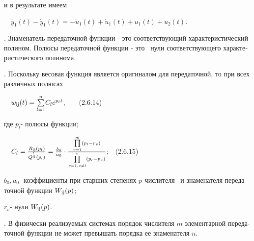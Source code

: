 \documentclass[a4paper]{article}
\newcommand\normalsubformula[1]{\text{\mathversion{normal}$#1$}}
\begin{document}
{\begin{russian}\sffamily
и в результате имеем
\end{russian}}

{\begin{russian}\sffamily
\ \  $\dddot y_1(t)-\dot y_1(t)=-\ddot u_1\left(t\right)+\dot u_1(t)+u_1(t)+u_2(t)$.
\end{russian}}

{\begin{russian}. Знаменатель передаточной функции - это соответствующий харак­те­ри­стический полином. Полюсы передаточной функции -
это \ нули соответ­ству­ющего характеристического полинома.
\end{russian}}

{\begin{russian}. Поскольку весовая функция является оригиналом для передаточной, то при всех различных полюсах
\end{russian}}

{\begin{russian}\sffamily
\ \  $w_{\normalsubformula{\text{ij}}}(t)=\overset n{\underset{l=1}{\sum }}C_le^{p_lt}$,\ \ \ \ (2.6.14)
\end{russian}}

{\begin{russian}\sffamily
где  $p_l$- полюсы функции;
\end{russian}}

{\begin{russian}\sffamily
\ \  $C_l=\frac{R_{\normalsubformula{\text{ij}}}(p_l)}{Q^{'_{\normalsubformula{\text{ij}}}}(p_l)}=\frac{b_0}{a_0}\cdot
\frac{\overset m{\underset{v=1}{\prod }}(p_l-r_v)}{\overset n{\underset{v=1,v\neq l}{\prod }}(p_l-p_v)}$;\ \ (2.6.15)
\end{russian}}

{\begin{russian}\sffamily
 $b_0,a_0$- коэффициенты при старших степенях  $p_{}^{}$ числителя \ и знаменателя передаточной функции 
$W_{\normalsubformula{\text{ij}}}(p)$;
\end{russian}}

{\begin{russian}\sffamily
 $r_v$- нули  $W_{\normalsubformula{\text{ij}}}(p)$.
\end{russian}}

{\begin{russian}. В физически реализуемых системах порядок числителя  $m$ элементарной передаточной функции не может превышать порядка
ее знаменателя  $n$.
\end{russian}}
\end{document}
